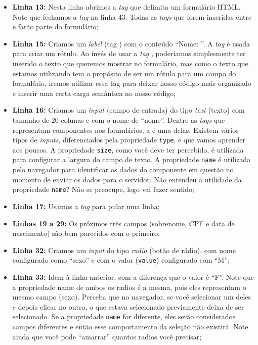 \begin{itemize}
    \item \textbf{Linha 13:} Nesta linha abrimos a \textit{tag}  que delimita um formulário HTML. Note que fechamos a \textit{tag}  na linha 43. Todas as \textit{tags} que forem inseridas entre  e  farão parte do formulário;
    
    \item \textbf{Linha 15:} Criamos um \textit{label} (tag ) com o conteúdo ``Nome: ''. A \textit{tag}  é usada para criar um rótulo. Ao invés de usar a \textit{tag} , poderíamos simplesmente ter inserido o texto que queremos mostrar no formulário, mas como o texto que estamos utilizando tem o propósito de ser um rótulo para um campo do formulário, iremos utilizar essa tag para deixar nosso código mais organizado e inserir uma certa carga semântica no nosso código;
    
    \item \textbf{Linha 16:} Criamos um \textit{input} (campo de entrada) do tipo \textit{text} (texto) com tamanho de 20 colunas e com o nome de ``nome''. Dentre as \textit{tags} que representam componentes nos formulários, a  é uma delas. Existem vários tipos de \textit{inputs}, diferenciados pela propriedade \texttt{type}, e que vamos aprender aos poucos. A propriedade \texttt{size}, como você deve ter percebido, é utilizada para configurar a largura do campo de texto. A propriedade \texttt{name} é utilizada pelo navegador para identificar os dados do componente em questão no momento de enviar os dados para o servidor. Não entendeu a utilidade da propriedade \texttt{name}? Não se preocupe, logo vai fazer sentido;
    
    \item \textbf{Linha 17:} Usamos a \textit{tag}  para pular uma linha;
    
    \item \textbf{Linhas 19 a 29:} Os próximos três campos (sobrenome, CPF e data de nascimento) são bem parecidos com o primeiro;
    
    \item \textbf{Linha 32:} Criamos um \textit{input} do tipo \textit{radio} (botão de rádio), com nome configurado como ``sexo'' e com o valor (\texttt{value}) configurado com ``M'';
    
    \item \textbf{Linha 33:} Idem à linha anterior, com a diferença que o valor é ``F''. Note que a propriedade name de ambos os radios é a mesma, pois eles representam o mesmo campo (sexo). Perceba que no navegador, se você selecionar um deles e depois clicar no outro, o que estava selecionado previamente deixa de ser selecionado. Se a propriedade \texttt{name} for diferente, eles serão considerados campos diferentes e então esse comportamento da seleção não existirá. Note ainda que você pode ``amarrar'' quantos radios você precisar;
    

\end{itemize}
